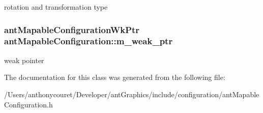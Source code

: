 rotation and transformation type \hypertarget{classant_mapable_configuration_a4e41179ff8075a4d8834e4151bbd7fdb}{
\subsubsection[{m\+\_\+weak\+\_\+ptr}]{\setlength{\rightskip}{0pt plus 5cm}ant\+Mapable\+Configuration\+Wk\+Ptr ant\+Mapable\+Configuration\+::m\+\_\+weak\+\_\+ptr\hspace{0.3cm}{\ttfamily [private]}}}\label{classant_mapable_configuration_a4e41179ff8075a4d8834e4151bbd7fdb}
weak pointer 

The documentation for this class was generated from the following file\+:\begin{DoxyCompactItemize}
\item 
/\+Users/anthonycouret/\+Developer/ant\+Graphics/include/configuration/ant\+Mapable\+Configuration.\+h\end{DoxyCompactItemize}
